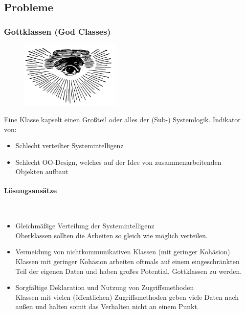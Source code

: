 \documentclass[ngerman,color=3b]{tuda_summary}
\begin{document}
\subsection{Probleme}
\subsubsection{Gottklassen (God Classes)}%
\begin{figure}%
    \vspace*{-5mm}
    \includegraphics[width=5cm]{bilder/Godclass.pdf}
\end{figure}
Eine Klasse kapselt einen Großteil oder alles der (Sub-) Systemlogik. Indikator von:
\begin{itemize}
    \item Schlecht verteilter Systemintelligenz
    \item Schlecht OO-Design, welches auf der Idee von zusammenarbeitenden Objekten aufbaut
\end{itemize}

\paragraph{Lösungsansätze}\mbox{}\\
\begin{itemize}
    \item Gleichmäßige Verteilung der Systemintelligenz \\
          Oberklassen sollten die Arbeiten so gleich wie möglich verteilen.
    \item Vermeidung von nichtkommunikativen Klassen (mit geringer Kohäsion) \\
          Klassen mit geringer Kohäsion arbeiten oftmals auf einem eingeschränkten Teil der eigenen Daten und haben großes Potential, Gottklassen zu werden.
    \item Sorgfältige Deklaration und Nutzung von Zugriffsmethoden \\
          Klassen mit vielen (öffentlichen) Zugriffsmethoden geben viele Daten nach außen und halten somit das Verhalten nicht an einem Punkt.
\end{itemize}
\end{document}
